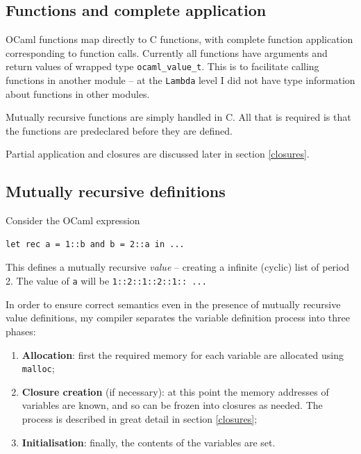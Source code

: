 \documentclass[12pt,a4paper,twoside,openright]{report}
\begin{document}
\subsection{Functions and complete application}\label{functions}

OCaml functions map directly to C functions, with complete function application
corresponding to function calls. Currently all functions have arguments and
return values of wrapped type \lstinline!ocaml_value_t!. This is to facilitate
calling functions in another module -- at the \lstinline!Lambda! level I did
not have type information about functions in other modules.

Mutually recursive functions are simply handled in C. All that is required is
that the functions are predeclared before they are defined.

Partial application and closures are discussed later in section \ref{closures}.

\subsection{Mutually recursive definitions}\label{mutually-recursive-values}

Consider the OCaml expression

\begin{lstlisting}
let rec a = 1::b and b = 2::a in ...
\end{lstlisting}

This defines a mutually recursive \textit{value} -- creating a infinite
(cyclic) list of period 2. The value of \lstinline!a! will be
\lstinline!1::2::1::2::1:: ...!

In order to ensure correct semantics even in the presence of mutually recursive
value definitions, my compiler separates the variable definition process into
three phases:

\begin{enumerate}
  \item \textbf{Allocation}: first the required memory for each variable are
    allocated using \lstinline!malloc!;
  \item \textbf{Closure creation} (if necessary): at this point the memory
    addresses of variables are known, and so can be frozen into closures as
    needed. The process is described in great detail in section \ref{closures};
  \item \textbf{Initialisation}: finally, the contents of the variables are
    set.
\end{enumerate}
\end{document}
